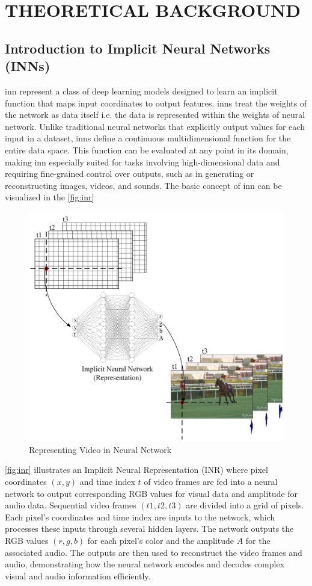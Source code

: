 \section{\MakeUppercase{Theoretical Background}}
    \subsection{Introduction to Implicit Neural Networks (INNs)}
    \gls{inn} represent a class of deep learning models designed to learn an implicit function that maps input coordinates to output features. \gls{inn}s treat the weights of the network as data itself i.e. the data is represented within the weights of neural network. Unlike traditional neural networks that explicitly output values for each input in a dataset, \gls{inn}s define a continuous multidimensional function for the entire data space. This function can be evaluated at any point in its domain, making \gls{inn} especially suited for tasks involving high-dimensional data and requiring fine-grained control over outputs, such as in generating or reconstructing images, videos, and sounds. The basic concept of \gls{inn} can be visualized in the \autoref{fig:inr}
    \begin{figure}[H]
        \centering
        \includegraphics[height=0.45\textheight]{assets/INR.png}
        \caption{Representing Video in Neural Network}
        \label{fig:inr}
    \end{figure}
    \autoref{fig:inr} illustrates an Implicit Neural Representation (INR) where pixel coordinates $(x, y)$ and time index $t$ of video frames are fed into a neural network to output corresponding RGB values for visual data and amplitude for audio data. Sequential video frames $(t1, t2, t3)$ are divided into a grid of pixels. Each pixel's coordinates and time index are inputs to the network, which processes these inputs through several hidden layers. The network outputs the RGB values $(r, g, b)$ for each pixel's color and the amplitude $A$ for the associated audio. The outputs are then used to reconstruct the video frames and audio, demonstrating how the neural network encodes and decodes complex visual and audio information efficiently.

